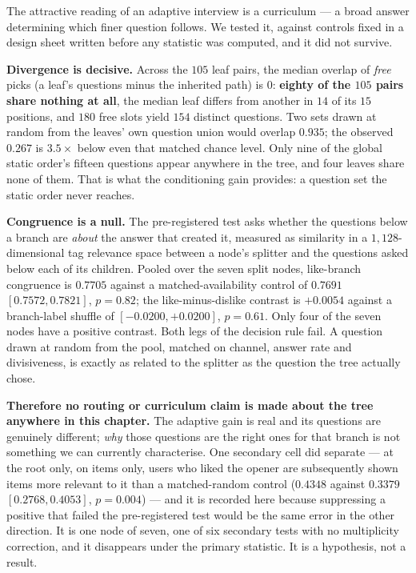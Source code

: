 \documentclass[11pt]{article}
\begin{document}
The attractive reading of an adaptive interview is a curriculum --- a broad answer determining which
finer question follows. We tested it, against controls fixed in a design sheet written before any
statistic was computed, and it did not survive.

\textbf{Divergence is decisive.} Across the $105$ leaf pairs, the median overlap of \emph{free} picks
(a leaf's questions minus the inherited path) is $0$: \textbf{eighty of the $105$ pairs share nothing
at all}, the median leaf differs from another in $14$ of its $15$ positions, and $180$ free slots
yield $154$ distinct questions. Two sets drawn at random from the leaves' own question union would
overlap $0.935$; the observed $0.267$ is $3.5\times$ below even that matched chance level. Only nine
of the global static order's fifteen questions appear anywhere in the tree, and four leaves share
none of them. That is what the conditioning gain provides: a question set the static order never reaches.

\textbf{Congruence is a null.} The pre-registered test asks whether the questions below a branch are
\emph{about} the answer that created it, measured as similarity in a $1{,}128$-dimensional tag
relevance space between a node's splitter and the questions asked below each of its children. Pooled
over the seven split nodes, like-branch congruence is $0.7705$ against a matched-availability control
of $0.7691$ $[0.7572,0.7821]$, $p{=}0.82$; the like-minus-dislike contrast is $+0.0054$ against a
branch-label shuffle of $[-0.0200,+0.0200]$, $p{=}0.61$. Only four of the seven nodes have a positive
contrast. Both legs of the decision rule fail. A question drawn at random from the pool, matched on
channel, answer rate and divisiveness, is exactly as related to the splitter as the question the tree
actually chose.

\textbf{Therefore no routing or curriculum claim is made about the tree anywhere in this chapter.}
The adaptive gain is real and its questions are genuinely different; \emph{why} those questions are
the right ones for that branch is not something we can currently characterise. One secondary cell did
separate --- at the root only, on items only, users who liked the opener are subsequently shown items
more relevant to it than a matched-random control ($0.4348$ against $0.3379$ $[0.2768,0.4053]$,
$p{=}0.004$) --- and it is recorded here because suppressing a positive that failed the
pre-registered test would be the same error in the other direction. It is one node of seven, one of
six secondary tests with no multiplicity correction, and it disappears under the primary statistic.
It is a hypothesis, not a result.
\end{document}

